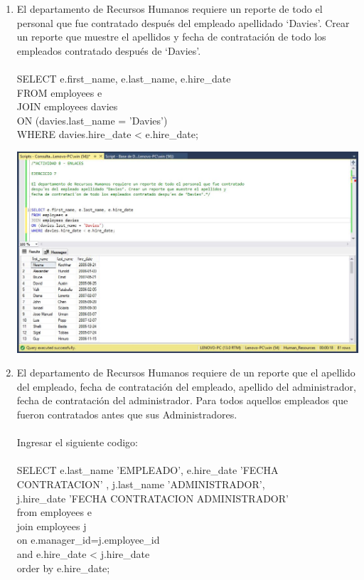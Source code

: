 \begin{enumerate}[1.]
	\item El departamento de Recursos Humanos requiere un reporte de todo el personal que fue contratado después del empleado apellidado ‘Davies’. Crear un reporte que muestre el apellidos y fecha de contrataci\'on de todo los empleados contratado después de ‘Davies’.
	\\
	\\SELECT e.first\_name, e.last\_name, e.hire\_date
	\\FROM employees e
	\\JOIN employees davies
	\\ON (davies.last\_name = 'Davies')
	\\WHERE davies.hire\_date <  e.hire\_date;\\

	\begin{center}
	\includegraphics[width=17cm]{./Imagenes/Actividad8-Ejercicio07} 
	\end{center}

	\item El departamento de Recursos Humanos requiere de un reporte que el apellido del empleado, fecha de contrataci\'on del empleado, apellido del administrador, fecha de contratación del administrador. Para todos aquellos empleados que fueron contratados antes que sus Administradores.
	\\
	\\Ingresar el siguiente codigo:
	\\
	\\SELECT e.last\_name 'EMPLEADO', e.hire\_date 'FECHA CONTRATACION' , j.last\_name 'ADMINISTRADOR',
	\\j.hire\_date 'FECHA CONTRATACION ADMINISTRADOR'
	\\from employees e
	\\join employees j
	\\on e.manager\_id=j.employee\_id
	\\and e.hire\_date <  j.hire\_date
	\\order by e.hire\_date;\\


\end{enumerate}
